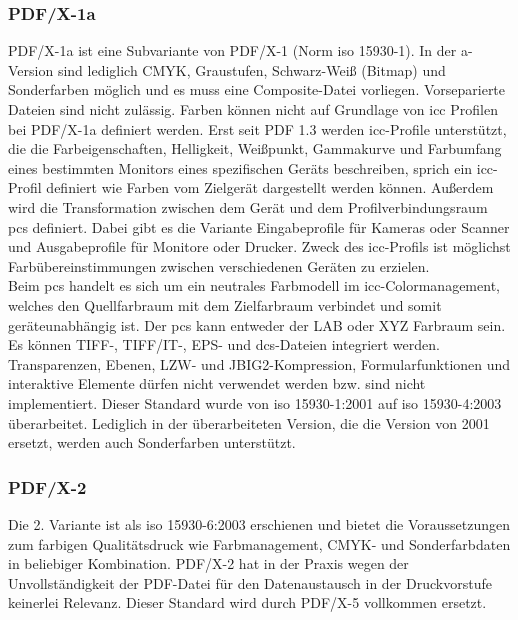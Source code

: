 \subsubsection{PDF/X-1a}
PDF/X-1a ist eine Subvariante von PDF/X-1 (Norm \gls{iso} 15930-1). In der a-Version sind lediglich CMYK, Graustufen, Schwarz-Weiß (Bitmap) und Sonderfarben möglich und es muss eine Composite-Datei vorliegen. Vorseparierte Dateien sind nicht zulässig. Farben können nicht auf Grundlage von \gls{icc} Profilen bei PDF/X-1a definiert werden. \cite{adobe-pdf-x, schneeberger} Erst seit PDF 1.3 werden \gls{icc}-Profile unterstützt, die die Farbeigenschaften, Helligkeit, Weißpunkt, Gammakurve und Farbumfang eines bestimmten Monitors eines spezifischen Geräts beschreiben, sprich ein \gls{icc}-Profil definiert wie Farben vom Zielgerät dargestellt werden können. Außerdem wird die Transformation zwischen dem Gerät und dem Profilverbindungsraum \gls{pcs} definiert. Dabei gibt es die Variante Eingabeprofile für Kameras oder Scanner und Ausgabeprofile für Monitore oder Drucker. Zweck des \gls{icc}-Profils ist möglichst Farbübereinstimmungen zwischen verschiedenen Geräten zu erzielen. \\ \cite{benq} Beim \gls{pcs} handelt es sich um ein neutrales Farbmodell im \gls{icc}-Colormanagement, welches den Quellfarbraum mit dem Zielfarbraum verbindet und somit geräteunabhängig ist. Der \gls{pcs} kann entweder der LAB oder XYZ Farbraum sein. \cite{prepress} \\
Es können  TIFF-, TIFF/IT-, EPS- und \gls{dcs}-Dateien integriert werden. Transparenzen, Ebenen, LZW- und JBIG2-Kompression, Formularfunktionen und interaktive Elemente dürfen nicht verwendet werden bzw. sind nicht implementiert. Dieser Standard wurde von \gls{iso} 15930-1:2001 auf \gls{iso} 15930-4:2003 überarbeitet. Lediglich in der überarbeiteten Version, die die Version von 2001 ersetzt, werden auch Sonderfarben unterstützt. \cite{proj-consult, schneeberger} 

\subsubsection{PDF/X-2}
Die 2. Variante ist als \gls{iso} 15930-6:2003 erschienen und bietet die Voraussetzungen zum farbigen Qualitätsdruck wie Farbmanagement, CMYK- und Sonderfarbdaten in beliebiger Kombination. PDF/X-2 hat in der Praxis wegen der Unvollständigkeit der PDF-Datei für den Datenaustausch in der Druckvorstufe keinerlei Relevanz. Dieser Standard wird durch PDF/X-5 vollkommen ersetzt. \cite{proj-consult, schneeberger}

